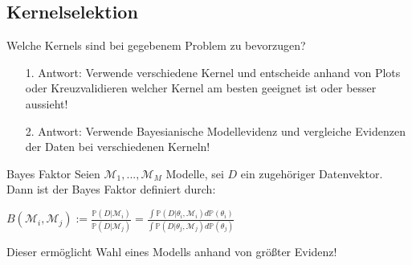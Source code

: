 \documentclass{beamer}
\begin{document}
{\begin{frame}


\end{frame}

\subsection{Kernelselektion}

\begin{frame}
Welche Kernels sind bei gegebenem Problem zu bevorzugen?\\
	\begin{itemize}
		\item[1.]Antwort: Verwende verschiedene Kernel und entscheide anhand von Plots oder Kreuzvalidieren welcher Kernel am besten geeignet ist oder besser aussieht!
		\item[2.]Antwort: Verwende Bayesianische Modellevidenz und vergleiche Evidenzen der Daten bei verschiedenen Kerneln!
	\end{itemize}
\end{frame}

\begin{frame}

\begin{block}{Bayes Faktor}
Seien $\mathcal{M}_1,...,\mathcal{M}_M$ Modelle, sei $D$ ein zugehöriger Datenvektor.
Dann ist der Bayes Faktor definiert durch:
\begin{center}
$B(\mathcal{M}_i, \mathcal{M}_j):= \frac{\mathbb{P}(D\vert \mathcal{M}_i)}{\mathbb{P}(D\vert \mathcal{M}_j)} = \frac{\int\mathbb{P}(D\vert \theta_i, \mathcal{M}_i )d\mathbb{P}(\theta_i)}{\int\mathbb{P}(D\vert \theta_j, \mathcal{M}_j )d\mathbb{P}(\theta_j)}$
\end{center}
\end{block}

Dieser ermöglicht Wahl eines Modells anhand von größter Evidenz!


\end{frame}


}
\end{document}
